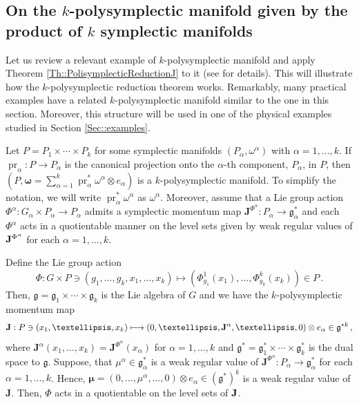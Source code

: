 \documentclass[11pt]{article}
\theoremstyle{plain}
\theoremstyle{definition}
\newcommand{\bomega}{{\boldsymbol{\omega}}}
\newcommand{\x}{\times}
\DeclareMathOperator{\pr}{pr}
\numberwithin{equation}{section}
\begin{document}
\subsection{On the \texorpdfstring{$k$}{}-polysymplectic manifold given by the product of \texorpdfstring{$k$}{} symplectic manifolds}
\label{Sec::SymplProduct}

Let us review a relevant example of $k$-polysymplectic manifold and apply Theorem \ref{Th::PolisymplecticReductionJ} to it (see \cite{MRSV_15} for details). This will illustrate how the $k$-polysymplectic reduction theorem works. Remarkably, many practical examples have a related $k$-polysymplectic manifold similar to the one in this section. Moreover, this structure will be used in one of the physical examples studied in Section \ref{Sec::examples}.

Let $P=P_1\times\dotsb\times P_k$ for some symplectic manifolds $(P_\alpha,\omega^\alpha)$ with $\alpha=1,\ldots,k$. If $\pr_\alpha: P\rightarrow P_\alpha$ is the canonical projection onto the $\alpha$-th component, $P_\alpha$, in $P$, then $(P,\bomega=\sum_{\alpha=1}^k\pr_\alpha^*\omega^\alpha\otimes e_\alpha)$ is a $k$-polysymplectic manifold. To simplify the notation, we will write $\pr_\alpha^\ast\omega^\alpha$ as $\omega^\alpha$. Moreover, assume that a Lie group action $\Phi^\alpha: G_\alpha\x P_\alpha\rightarrow P_\alpha$  admits a symplectic momentum map $\mathbf{J}^{\Phi^\alpha}: P_\alpha\rightarrow\mathfrak{g}^*_\alpha$ and each $\Phi^\alpha$ acts in a quotientable manner on the level sets given by weak regular values of ${\bf J}^{\Phi^\alpha}$ for each $\alpha=1,\ldots,k$.

Define the Lie group action 
\begin{equation}\label{eq:GrAck}
    \Phi:G\x P\ni (g_1,\ldots,g_k,x_1,\ldots,x_k)\longmapsto (\Phi^1_{g_1}(x_1),\ldots,\Phi^k_{g_k}(x_k))\in P\,.
\end{equation}
Then, $\mathfrak{g}=\mathfrak{g}_1\x\dotsb\x\mathfrak{g}_k$ is the Lie algebra of $G$ and we have the $k$-polysymplectic momentum map 
\[
\mathbf{J}:P\ni(x_1,\ldots,x_k)\longmapsto
(0,\ldots, {\bf J}^\alpha,\ldots,0)\otimes {e}_\alpha\in \mathfrak{g}^{*k}\,,
\]
where $\mathbf{J}^\alpha(x_1,\ldots,x_k)=\mathbf{J}^{\Phi^\alpha}(x_\alpha)$ for $\alpha=1,\ldots,k$ and $\mathfrak{g}^*=\mathfrak{g}_1^*\x\dotsb\x\mathfrak{g}_k^*$ is the dual space to $\mathfrak{g}$.
Suppose, that $\mu^\alpha\in\mathfrak{g}^*_\alpha$ is a weak regular value of $\mathbf{J}^{\Phi^\alpha}:P_\alpha\rightarrow\mathfrak{g}^*_\alpha$ for each $\alpha=1,\ldots,k$. Hence, $\bm{\mu}= (0,\ldots,\mu^\alpha,\ldots,0) \otimes e_\alpha\in(\mathfrak{g}^*)^k$ is a weak regular value of $\mathbf{J}$. Then, $\Phi$ acts in a quotientable on the level sets of ${\bf J}$.
\end{document}
